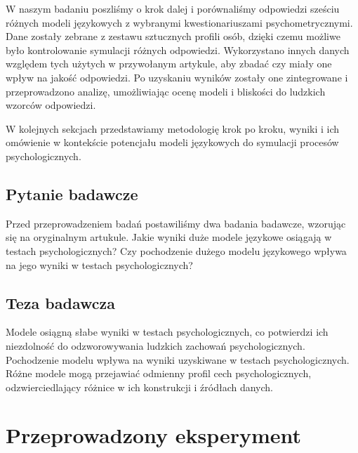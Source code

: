 \documentclass{article}
\begin{document}
W naszym badaniu poszliśmy o krok dalej i porównaliśmy odpowiedzi sześciu różnych modeli językowych z wybranymi kwestionariuszami psychometrycznymi. 
Dane zostały zebrane z zestawu sztucznych profili osób, dzięki czemu możliwe było kontrolowanie symulacji różnych odpowiedzi. Wykorzystano innych danych względem tych użytych w przywołanym artykule, aby zbadać czy miały one wpływ na jakość odpowiedzi.
Po uzyskaniu wyników zostały one zintegrowane i przeprowadzono analizę, umożliwiając ocenę modeli i bliskości do ludzkich wzorców odpowiedzi.

W kolejnych sekcjach przedstawiamy metodologię krok po kroku, wyniki i ich omówienie w kontekście potencjału modeli językowych do symulacji procesów psychologicznych.
\subsection{Pytanie badawcze}
Przed przeprowadzeniem badań postawiliśmy dwa badania badawcze, wzorując się na oryginalnym artukule. 
Jakie wyniki duże modele językowe osiągają w testach psychologicznych? Czy pochodzenie dużego modelu językowego wpływa na jego wyniki w testach psychologicznych?

\subsection{Teza badawcza}
Modele osiągną słabe wyniki w testach psychologicznych, co potwierdzi ich niezdolność do odzworowywania ludzkich zachowań psychologicznych.
Pochodzenie modelu wpływa na wyniki uzyskiwane w testach psychologicznych. Różne modele mogą przejawiać odmienny profil cech psychologicznych, odzwierciedlający różnice w ich konstrukcji i źródłach danych.

\section{Przeprowadzony eksperyment}
\end{document}
